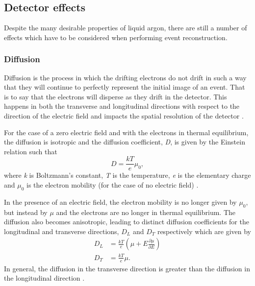 \subsection{Detector effects}

Despite the many desirable properties of liquid argon, there are still a number of effects which have to be considered when performing event reconstruction.

\subsubsection{Diffusion}

Diffusion is the process in which the drifting electrons do not drift in such a way that they will continue to perfectly represent the initial image of an event. That is to say that the electrons will disperse as they drift in the detector. This happens in both the transverse and longitudinal directions with respect to the direction of the electric field and impacts the spatial resolution of the detector \cite{LArTPC_book}. 

For the case of a zero electric field and with the electrons in thermal equilibrium, the diffusion is isotropic and the diffusion coefficient, \textit{D}, is given by the Einstein relation such that
\begin{equation}
    D = \frac{kT}{e}\mu_0,
\end{equation}
where \textit{k} is Boltzmann's constant, \textit{T} is the temperature, \textit{e} is the elementary charge and $\mu_0$ is the electron mobility (for the case of no electric field) \cite{LArTPC_book}.

In the presence of an electric field, the electron mobility is no longer given by $\mu_0$, but instead by $\mu$ and the electrons are no longer in thermal equilibrium. The diffusion also becomes anisotropic, leading to distinct diffusion coefficients for the longitudinal and transverse directions, $D_L$ and $D_T$ respectively which are given by
\begin{equation}
\begin{split}
    D_L &= \frac{kT}{e}(\mu + E \frac{\partial \mu}{\partial E}) \\
    D_T &= \frac{kT}{e}\mu.
\end{split}
\end{equation}
In general, the diffusion in the transverse direction is greater than the diffusion in the longitudinal direction \cite{LArTPC_book} \cite{diffusion}.


